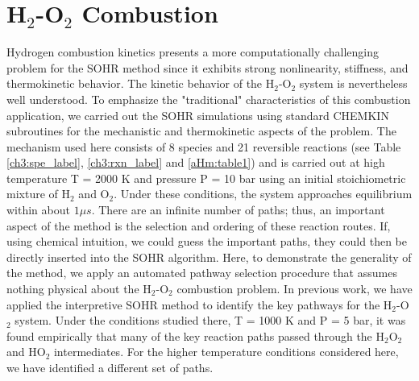\section{H$_2$-O$_2$ Combustion}
\label{ch4:sec:H2_O2}
Hydrogen combustion kinetics presents a more computationally challenging problem for the
SOHR method since it exhibits strong nonlinearity, stiffness,
and thermokinetic behavior. The kinetic behavior of the H$_2$-O$_2$
system is nevertheless well understood.\cite{ch4_34_warnatz2006physical} To emphasize the
"traditional" characteristics of this combustion application, we
carried out the SOHR simulations using standard CHEMKIN
subroutines for the mechanistic and thermokinetic aspects of
the problem. The mechanism used here consists of 8 species and 21 reversible reactions (see Table \ref{ch3:spe_label}, \ref{ch3:rxn_label} and \ref{aHm:table1}) and is carried out at
high temperature T = 2000 K and pressure P = 10 bar using an
initial stoichiometric mixture of H$_2$ and O$_2$. Under these
conditions, the system approaches equilibrium within about $1 \mu s$. There are an infinite number of paths; thus, an important
aspect of the method is the selection and ordering of these
reaction routes. If, using chemical intuition, we could guess the
important paths, they could then be directly inserted into the
SOHR algorithm. Here, to demonstrate the generality of the
method, we apply an automated pathway selection procedure
that assumes nothing physical about the H$_2$-O$_2$ combustion
problem. In previous work, we have applied the interpretive
SOHR method to identify the key pathways for the H$_2$-O$_2$
system. Under the conditions studied there, T = 1000 K and P
= 5 bar, it was found empirically that many of the key reaction
paths passed through the H$_2$O$_2$ and HO$_2$ intermediates. For the
higher temperature conditions considered here, we have
identified a different set of paths.
\newline
